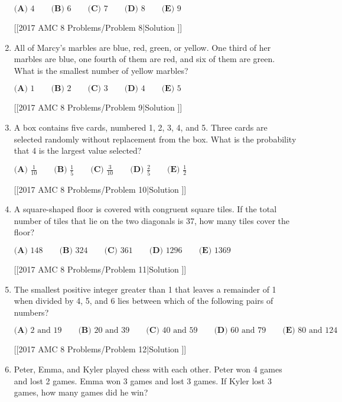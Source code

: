 \documentclass{article}
\begin{document}
\begin{enumerate}[label=\arabic*., itemsep=0.5em]
\(\textbf{(A) }4\qquad\textbf{(B) }6\qquad\textbf{(C) }7\qquad\textbf{(D) }8\qquad\textbf{(E) }9\)

[[2017 AMC 8 Problems/Problem 8|Solution
]]\par \vspace{0.5em}\item All of Marcy's marbles are blue, red, green, or yellow. One third of her marbles are blue, one fourth of them are red, and six of them are green. What is the smallest number of yellow marbles?

\(\textbf{(A) }1\qquad\textbf{(B) }2\qquad\textbf{(C) }3\qquad\textbf{(D) }4\qquad\textbf{(E) }5\)

[[2017 AMC 8 Problems/Problem 9|Solution
]]\par \vspace{0.5em}\item A box contains five cards, numbered 1, 2, 3, 4, and 5. Three cards are selected randomly without replacement from the box. What is the probability that 4 is the largest value selected?

\(\textbf{(A) }\frac{1}{10}\qquad\textbf{(B) }\frac{1}{5}\qquad\textbf{(C) }\frac{3}{10}\qquad\textbf{(D) }\frac{2}{5}\qquad\textbf{(E) }\frac{1}{2}\)

[[2017 AMC 8 Problems/Problem 10|Solution
]]\par \vspace{0.5em}\item A square-shaped floor is covered with congruent square tiles. If the total number of tiles that lie on the two diagonals is 37, how many tiles cover the floor?

\(\textbf{(A) }148\qquad\textbf{(B) }324\qquad\textbf{(C) }361\qquad\textbf{(D) }1296\qquad\textbf{(E) }1369\)

[[2017 AMC 8 Problems/Problem 11|Solution
]]\par \vspace{0.5em}\item The smallest positive integer greater than 1 that leaves a remainder of 1 when divided by 4, 5, and 6 lies between which of the following pairs of numbers?

\(\textbf{(A) }2\text{ and }19\qquad\textbf{(B) }20\text{ and }39\qquad\textbf{(C) }40\text{ and }59\qquad\textbf{(D) }60\text{ and }79\qquad\textbf{(E) }80\text{ and }124\)

[[2017 AMC 8 Problems/Problem 12|Solution
]]\par \vspace{0.5em}\item Peter, Emma, and Kyler played chess with each other. Peter won 4 games and lost 2 games. Emma won 3 games and lost 3 games. If Kyler lost 3 games, how many games did he win?


\end{enumerate}
\end{document}
